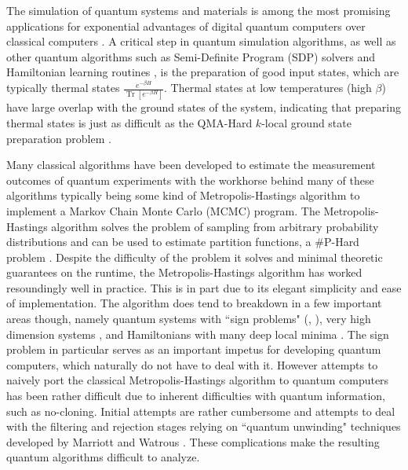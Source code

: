 \documentclass[
 amsmath,amssymb,
 aps,
onecolumn, 
nofootinbib]{revtex4-2}
\newcommand{\brackets}[1]{\left[ #1 \right]}
\DeclareMathOperator{\Tr}{Tr}
\newcommand{\trace}[1]{\Tr \brackets{ #1 }}
\begin{document}
The simulation of quantum systems and materials is among the most promising applications for exponential advantages of digital quantum computers over classical computers \cite{aspuru2005simulated} \cite{reiher2017elucidating} \cite{tensorHypercontraction}. A critical step in quantum simulation algorithms, as well as other quantum algorithms such as Semi-Definite Program (SDP) solvers \cite{brandao2019sdp} and Hamiltonian learning routines \cite{anshu_sample-efficient_2021}, is the preparation of good input states, which are typically thermal states $\frac{e^{-\beta H}}{\trace{e^{-\beta H}}}$. Thermal states at low temperatures (high $\beta$) have large overlap with the ground states of the system, indicating that preparing thermal states is just as difficult as the QMA-Hard $k$-local ground state preparation problem \cite{kempe2005complexitylocalhamiltonianproblem}. 

Many classical algorithms have been developed to estimate the measurement outcomes of quantum experiments with the workhorse behind many of these algorithms typically being some kind of Metropolis-Hastings algorithm \cite{metropolis1953equation} to implement a Markov Chain Monte Carlo (MCMC) program. The Metropolis-Hastings algorithm solves the problem of sampling from arbitrary probability distributions and can be used to estimate partition functions, a \#P-Hard problem \cite{roth1996hardness}. Despite the difficulty of the problem it solves and minimal theoretic guarantees on the runtime, the Metropolis-Hastings algorithm has worked resoundingly well in practice. This is in part due to its elegant simplicity and ease of implementation. The algorithm does tend to breakdown in a few important areas though, namely quantum systems with ``sign problems" (\cite{signProblemOG}, \cite{troyer2005sign}), very high dimension systems \cite{beskos2010optimaltuninghybridmontecarlo}, and Hamiltonians with many deep local minima \cite{betancourt2018conceptualintroductionhamiltonianmonte}. The sign problem in particular serves as an important impetus for developing quantum computers, which naturally do not have to deal with it. However attempts to naively port the classical Metropolis-Hastings algorithm to quantum computers has been rather difficult due to inherent difficulties with quantum information, such as no-cloning. Initial attempts \cite{temme2011} are rather cumbersome and attempts to deal with the filtering and rejection stages relying on ``quantum unwinding" techniques developed by Marriott and Watrous \cite{marriott2005quantum}. These complications make the resulting quantum algorithms difficult to analyze. 
\end{document}
